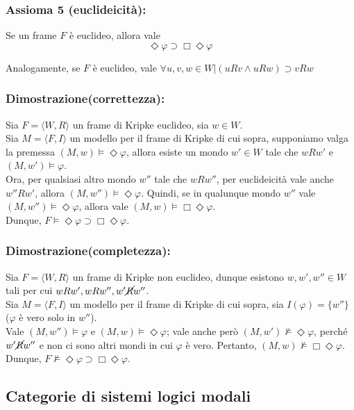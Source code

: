 \subsubsection{Assioma 5 (euclideicità):} Se un frame $F$ è euclideo, allora vale $$\Diamond \varphi \supset \Box \Diamond \varphi$$

Analogamente, se $F$ è euclideo, vale $\forall u, v, w \in W  | (uRv \land uRw) \supset vRw$

\subsubsection{Dimostrazione(correttezza):}
Sia $F = \langle W, R \rangle$ un frame di Kripke euclideo, sia $w \in W$.\\
Sia $M = \langle F, I \rangle$ un modello per il frame di Kripke di cui sopra, supponiamo valga la premessa $(M, w) \models \Diamond \varphi$, allora esiste un mondo $w' \in W$ tale che $wRw'$ e $(M, w') \models \varphi$.\\
Ora, per qualsiasi altro mondo $w''$ tale che $wRw''$, per euclideicità vale anche $w''Rw'$, allora $(M, w'') \models \Diamond \varphi$. Quindi, se in qualunque mondo $w''$ vale $(M, w'') \models \Diamond \varphi$, allora vale $(M, w) \models \Box \Diamond \varphi$.\\
Dunque, $F \models \Diamond \varphi \supset \Box \Diamond \varphi$.

\subsubsection{Dimostrazione(completezza):}
Sia $F = \langle W, R \rangle$ un frame di Kripke non euclideo, dunque esistono $w, w', w'' \in W$ tali per cui $wRw', wRw'', w'\cancel{R}w''$.\\
Sia $M = \langle F, I \rangle$ un modello per il frame di Kripke di cui sopra, sia $I(\varphi) = \{w''\}$ ($\varphi$ è vero solo in $w''$).\\
Vale $(M, w'') \models \varphi$ e $(M, w) \models \Diamond \varphi$; vale anche però $(M, w') \not \models \Diamond \varphi$, perché $w'\cancel{R}w''$ e non ci sono altri mondi in cui $\varphi$ è vero. Pertanto, $(M, w) \not \models \Box \Diamond \varphi$.\\
Dunque, $F \not \models \Diamond \varphi \supset \Box \Diamond \varphi$.


\subsection{Categorie di sistemi logici modali}

